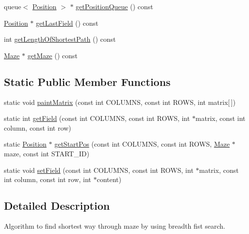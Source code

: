 \begin{DoxyCompactItemize}
\item 
queue$<$ \hyperlink{class_position}{Position} $>$ $\ast$ \hyperlink{class_breadth_first_search_af5345d1f260e617dc3d1d0636341a71c}{get\-Position\-Queue} () const 
\item 
\hyperlink{class_position}{Position} $\ast$ \hyperlink{class_breadth_first_search_a72d8df8632e4b6bc86afea0793025a48}{get\-Last\-Field} () const 
\item 
int \hyperlink{class_breadth_first_search_a36963ae576749a6aa36f2075f757b925}{get\-Length\-Of\-Shortest\-Path} () const 
\item 
\hyperlink{class_maze}{Maze} $\ast$ \hyperlink{class_breadth_first_search_a6a261f54e17f89a6f55a8b11ee6c8e3b}{get\-Maze} () const 
\end{DoxyCompactItemize}
\subsection*{Static Public Member Functions}
\begin{DoxyCompactItemize}
\item 
static void \hyperlink{class_breadth_first_search_aa17fd4a24cc6c9765b64ba2e536d84c8}{paint\-Matrix} (const int C\-O\-L\-U\-M\-N\-S, const int R\-O\-W\-S, int matrix\mbox{[}$\,$\mbox{]})
\item 
static int \hyperlink{class_breadth_first_search_a1e5271b5561e4fe52b7e67917f72511e}{get\-Field} (const int C\-O\-L\-U\-M\-N\-S, const int R\-O\-W\-S, int $\ast$matrix, const int column, const int row)
\item 
static \hyperlink{class_position}{Position} $\ast$ \hyperlink{class_breadth_first_search_a533670621ed3c1e3bfba89d667dab4c3}{get\-Start\-Pos} (const int C\-O\-L\-U\-M\-N\-S, const int R\-O\-W\-S, \hyperlink{class_maze}{Maze} $\ast$maze, const int S\-T\-A\-R\-T\-\_\-\-I\-D)
\item 
static void \hyperlink{class_breadth_first_search_a29e052c3dd62782fabc59a68ef27cade}{set\-Field} (const int C\-O\-L\-U\-M\-N\-S, const int R\-O\-W\-S, int $\ast$matrix, const int column, const int row, int $\ast$content)
\end{DoxyCompactItemize}


\subsection{Detailed Description}
Algorithm to find shortest way through maze by using breadth fist search. 

